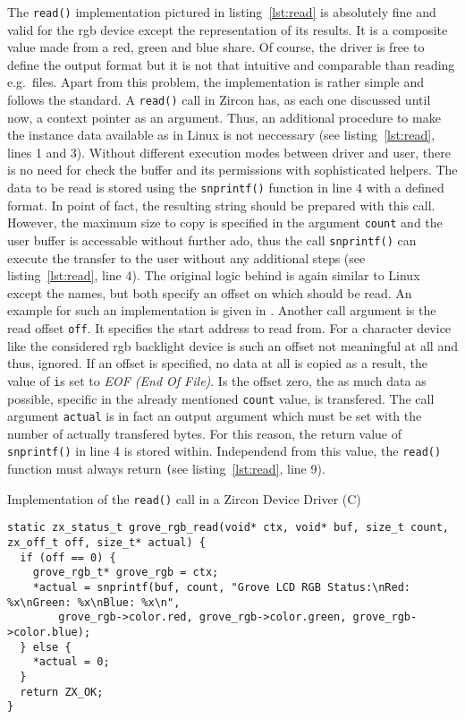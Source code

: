 The \texttt{read()} implementation pictured in listing~\ref{lst:read} is absolutely fine and valid for the \ac{rgb} device except the representation of its results.
It is a composite value made from a red, green and blue share.
Of course, the driver is free to define the output format but it is not that intuitive and comparable than reading e.g.\ files.
Apart from this problem, the implementation is rather simple and follows the standard.
A \texttt{read()} call in Zircon has, as each one discussed until now, a context pointer as an argument.
Thus, an additional procedure to make the instance data available as in Linux is not neccessary (see listing~\ref{lst:read}, lines 1 and 3).
Without different execution modes between driver and user, there is no need for check the buffer and its permissions with sophisticated helpers.
The data to be read is stored using the \texttt{snprintf()} function in line 4 with a defined format.
In point of fact, the resulting string should be prepared with this call.
However, the maximum size to copy is specified in the argument \texttt{count} and the user buffer is accessable without further ado, thus the call \texttt{snprintf()} can execute the transfer to the user without any additional steps (see listing~\ref{lst:read}, line 4).
The original logic behind is again similar to Linux except the names, but both specify an offset on which should be read.
An example for such an implementation is given in \cite{zircon-simpledrv}.
Another call argument is the read offset \texttt{off}.
It specifies the start address to read from.
For a character device like the considered \ac{rgb} backlight device is such an offset not meaningful at all and thus, ignored.
If an offset is specified, no data at all is copied as a result, the value of \texttt is set to \textit{EOF (End Of File)}.
Is the offset zero, the as much data as possible, specific in the already mentioned \texttt{count} value, is transfered.
The call argument \texttt{actual} is in fact an output argument which must be set with the number of actually transfered bytes.
For this reason, the return value of \texttt{snprintf()} in line 4 is stored within.
Independend from this value, the \texttt{read()} function must always return \texttt (see listing~\ref{lst:read}, line 9).


\begin{listing} [H]
    \caption{Implementation of the \texttt{read()} call in a Zircon Device Driver (C)}
\label{lst:read}
\begin{verbatim}
static zx_status_t grove_rgb_read(void* ctx, void* buf, size_t count, zx_off_t off, size_t* actual) {
  if (off == 0) {
    grove_rgb_t* grove_rgb = ctx;
    *actual = snprintf(buf, count, "Grove LCD RGB Status:\nRed: %x\nGreen: %x\nBlue: %x\n",
        grove_rgb->color.red, grove_rgb->color.green, grove_rgb->color.blue);
  } else {
    *actual = 0;
  }
  return ZX_OK;
}
\end{verbatim}
\end{listing}

